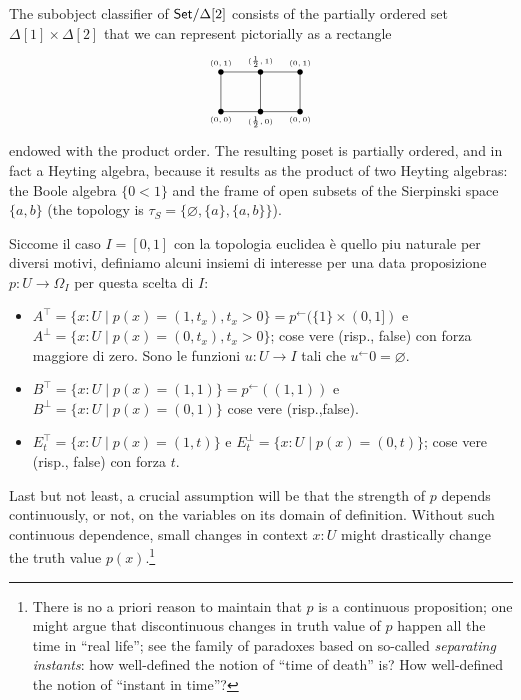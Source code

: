 \begin{remark}
The subobject classifier of $\mathsf{Set}/\Delta[2]$ consists of the partially ordered set $\Delta[1]\times\Delta[2]$ that we can represent pictorially as a rectangle
  \[\begin{tikzpicture}[xscale=2]
    \foreach \i/\name in {0/0,.5/{\frac{1}{2}},1/0}{
      \foreach \j/\pos in {0/below,1/above}
        \fill (\i,\j) ellipse (1pt and 2pt) node[\pos] {\tiny $(\name,\j)$};
    }
    \draw (0,0) rectangle (1,1);
    \draw (.5,1) -- (.5,0);
    \end{tikzpicture}\]
  endowed with the product order. The resulting poset is partially ordered, and in fact a Heyting algebra, because it results as the product of two Heyting algebras: the Boole algebra $\{0<1\}$ and the frame of open subsets of the Sierpinski space $\{a,b\}$ (the topology is $\tau_S = \{\varnothing, \{a\}, \{a,b\}\}$).
  \end{remark}
  \begin{remark}
    Siccome il caso $I=[0,1]$ con la topologia euclidea è quello piu naturale per diversi motivi, definiamo alcuni insiemi di interesse per una data proposizione $p : U \to \Omega_I$ per questa scelta di $I$:
  \begin{itemize}
    \item $A^\top = \{x : U \mid p(x) = (1,t_x), t_x > 0\} = p^\leftarrow(\{1\}\times (0,1])$ e $A^\perp = \{x : U \mid p(x) = (0,t_x), t_x > 0\}$; cose vere (risp., false) con forza maggiore di zero. Sono le funzioni $u : U \to I$ tali che $u^\leftarrow 0 = \varnothing$.
    \item $B^\top = \{x : U \mid p(x) = (1,1)\} = p^\leftarrow((1,1))$ e $B^\perp = \{x : U \mid p(x) = (0,1)\}$ cose vere (risp.,false).
    \item $E_t^\top = \{ x : U \mid p(x)=(1,t)\}$ e $E_t^\perp = \{ x : U \mid p(x)=(0,t)\}$; cose vere (risp., false) con forza $t$.
  \end{itemize}
  \end{remark}
  Last but not least, a crucial assumption will be that the strength of $p$ depends continuously, or not, on the variables on its domain of definition. Without such continuous dependence, small changes in context $x : U$ might drastically change the truth value $p(x)$.\footnote{There is no a priori reason to maintain that $p$ is a continuous proposition; one might argue that discontinuous changes in truth value of $p$ happen all the time in ``real life''; see the family of paradoxes based on so-called \emph{separating instants}: how well-defined the notion of ``time of death'' is? How well-defined the notion of ``instant in time''?}
